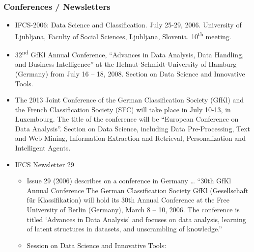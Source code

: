 \documentclass[
  letterpaper,
]{report}
\providecommand{\tightlist}{%
  \setlength{\itemsep}{0pt}\setlength{\parskip}{0pt}}\usepackage{longtable,booktabs,array}
\begin{document}
\hypertarget{conferences-newsletters}{%
\subsubsection{Conferences /
Newsletters}\label{conferences-newsletters}}

\begin{itemize}
\tightlist
\item
  IFCS-2006: Data Science and Classification. July 25-29, 2006.
  University of Ljubljana, Faculty of Social Sciences, Ljubljana,
  Slovenia. 10\textsuperscript{th} meeting.
\item
  32\textsuperscript{nd} GfKl Annual Conference, ``Advances in Data
  Analysis, Data Handling, and Business Intelligence'' at the
  Helmut-Schmidt-University of Hamburg (Germany) from July 16 -- 18,
  2008. Section on Data Science and Innovative Tools.
\item
  The 2013 Joint Conference of the German Classification Society (GfKl)
  and the French Classification Society (SFC) will take place in July
  10-13, in Luxembourg. The title of the conference will be ``European
  Conference on Data Analysis''. Section on Data Science, including Data
  Pre-Processing, Text and Web Mining, Information Extraction and
  Retrieval, Personalization and Intelligent Agents.
\item
  IFCS Newsletter 29

  \begin{itemize}
  \item
    Issue 29 (2006) describes on a conference in Germany \ldots{} ``30th
    GfKl Annual Conference The German Classification Society GfKl
    (Gesellschaft für Klassifikation) will hold its 30th Annual
    Conference at the Free University of Berlin (Germany), March 8 --
    10, 2006. The conference is titled `Advances in Data Analysis' and
    focuses on data analysis, learning of latent structures in datasets,
    and unscrambling of knowledge.''
  \item
    Session on Data Science and Innovative Tools:


\end{itemize}
\end{itemize}
\end{document}
